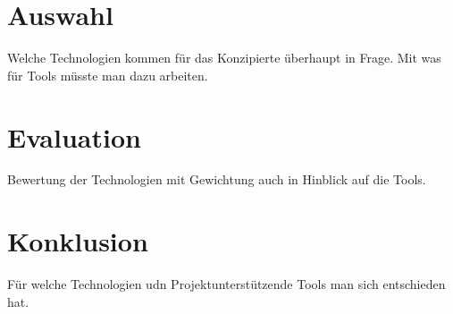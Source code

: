 \section{Auswahl}
Welche Technologien kommen für das Konzipierte überhaupt in Frage. Mit
was für Tools müsste man dazu arbeiten.

\section{Evaluation}
Bewertung der Technologien mit Gewichtung auch in Hinblick auf die Tools.

\section{Konklusion}
Für welche Technologien udn Projektunterstützende Tools man sich 
entschieden hat.